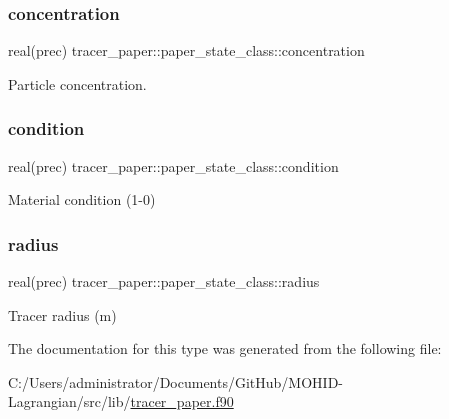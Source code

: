 \subsubsection{\texorpdfstring{concentration}{concentration}}
{\footnotesize\ttfamily real(prec) tracer\+\_\+paper\+::paper\+\_\+state\+\_\+class\+::concentration\hspace{0.3cm}{\ttfamily [private]}}



Particle concentration. 

\mbox{\label{structtracer__paper_1_1paper__state__class_a1e2ac1d6419a5ec39dd8529f8cd83112}} 
\subsubsection{\texorpdfstring{condition}{condition}}
{\footnotesize\ttfamily real(prec) tracer\+\_\+paper\+::paper\+\_\+state\+\_\+class\+::condition\hspace{0.3cm}{\ttfamily [private]}}



Material condition (1-\/0) 

\mbox{\label{structtracer__paper_1_1paper__state__class_a931d90e457142607c7e1079b99f72298}} 
\subsubsection{\texorpdfstring{radius}{radius}}
{\footnotesize\ttfamily real(prec) tracer\+\_\+paper\+::paper\+\_\+state\+\_\+class\+::radius\hspace{0.3cm}{\ttfamily [private]}}



Tracer radius (m) 



The documentation for this type was generated from the following file\+:\begin{DoxyCompactItemize}
\item 
C\+:/\+Users/administrator/\+Documents/\+Git\+Hub/\+M\+O\+H\+I\+D-\/\+Lagrangian/src/lib/\hyperlink{tracer__paper_8f90}{tracer\+\_\+paper.\+f90}\end{DoxyCompactItemize}
